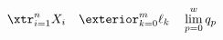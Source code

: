 \documentclass[border=3pt]{standalone}
\begin{document}
$\displaystyle
         \xtr_{i = 1}^{n} X_i     \quad
    \exterior_{k = 0}^{m} \ell_k  \quad
         \lim_{p = 0}^{w} q_p
$
\end{document}
